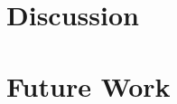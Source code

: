 \documentclass[conference]{IEEEtran}
\begin{document}
%

\section{Discussion}\label{sec:Discussion}


% 

\section{Future Work}\label{sec:Future_Work}


% 





%
\end{document}
